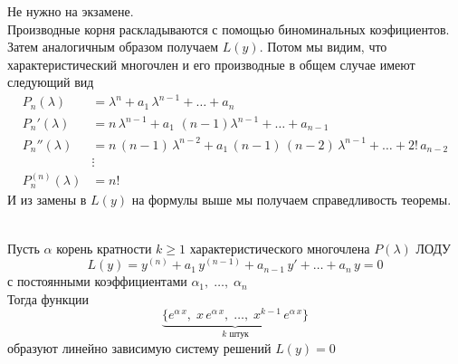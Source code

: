 \begin{Note}
    Не нужно на экзамене.\\
    Производные корня раскладываются с помощью биноминальных коэфициентов. Затем аналогичным образом получаем $L(y)$. Потом мы видим, что характеристический многочлен и его производные в общем случае имеют следующий вид
    \begin{align*}
    P_n(\lambda) &= \lambda^n + a_1\,\lambda^{n - 1} + \dots + a_n\\
    P_n'(\lambda) &= n\,\lambda^{n-1} + a_1\,\,(n - 1)\lambda^{n - 1} + \dots + a_{n-1}\\
    P_n''(\lambda) &= n\,(n-1)\,\lambda^{n - 2} + a_1\,(n-1)\,(n-2)\,\lambda^{n - 1} + \dots + 2!\,a_{n-2}\\
    &\vdots\\
    P_n^{(n)}(\lambda) &= n!
    \end{align*}
    И из замены в $L(y)$ на формулы выше мы получаем справедливость теоремы.
\end{Note}
\begin{Th}~\\
    Пусть $\alpha$ корень кратности $k \geqslant 1$ характеристического многочлена $P(\lambda)$ ЛОДУ
    \[
        L(y)=y^{(n)}+a_1\,y^{(n-1)}+a_{n-1}\,y'+\dots+a_n\,y=0
    \]
    с постоянными коэффициентами $\alpha_1,\; \dots,\; \alpha_n$\\
    Тогда функции 
    \[
        \underbrace{\{e^{\alpha\,x},\; x\,e^{\alpha\,x},\; \dots,\; x^{k-1}\,e^{\alpha\,x}\}}_{k \text{ штук}}
    \]
    образуют линейно зависимую систему решений $L(y)=0$
\end{Th}

